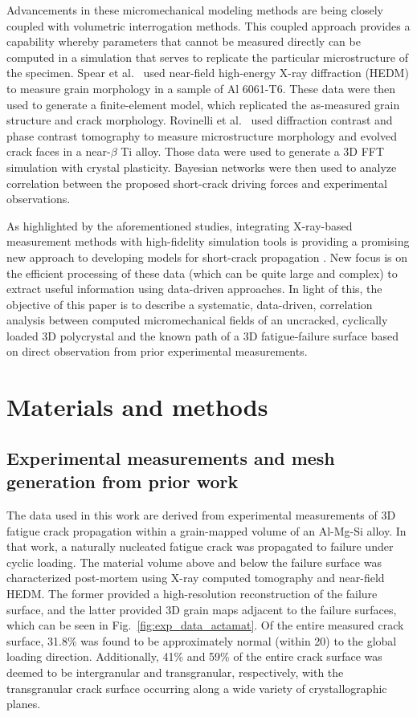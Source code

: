 Advancements in these micromechanical modeling methods are being closely coupled with volumetric interrogation methods.  This coupled approach provides a capability whereby parameters that cannot be measured directly can be computed in a simulation that serves to replicate the particular microstructure of the specimen. Spear et al.~\cite{spear2016} used near-field high-energy X-ray diffraction (HEDM) to measure grain morphology in a sample of Al 6061-T6. These data were then used to generate a finite-element model, which replicated the as-measured grain structure and crack morphology. Rovinelli et al.~\cite{Rovinelli_2017} used diffraction contrast and phase contrast tomography to measure microstructure morphology and evolved crack faces in a near-$\beta$ Ti alloy.  Those data were used to generate a 3D FFT simulation with crystal plasticity.  Bayesian networks were then used to analyze correlation between the proposed short-crack driving forces and experimental observations. 

As highlighted by the aforementioned studies, integrating X-ray-based measurement methods with high-fidelity simulation tools is providing a promising new approach to developing models for short-crack propagation \cite{Turner_2017}. New focus is on the efficient processing of these data (which can be quite large and complex) to extract useful information using data-driven approaches. In light of this, the objective of this paper is to describe a systematic, data-driven, correlation analysis between computed micromechanical fields of an uncracked, cyclically loaded 3D polycrystal and the known path of a 3D fatigue-failure surface based on direct observation from prior experimental measurements.

\section{Materials and methods}\label{methods}
\subsection{Experimental measurements and mesh generation from prior work} \label{prior_work}
The data used in this work are derived from experimental measurements \cite{spear2014} of 3D fatigue crack propagation within a grain-mapped volume of an Al-Mg-Si alloy. In that work, a naturally nucleated fatigue crack was propagated to failure under cyclic loading. The material volume above and below the failure surface was characterized post-mortem using X-ray computed tomography and near-field HEDM. The former provided a high-resolution reconstruction of the failure surface, and the latter provided 3D grain maps adjacent to the failure surfaces, which can be seen in Fig.~\ref{fig:exp_data_actamat}. Of the entire measured crack surface, 31.8\% was found to be approximately normal (within 20\degrees) to the global loading direction. Additionally, 41\% and 59\% of the entire crack surface was deemed to be intergranular and transgranular, respectively, with the transgranular crack surface occurring along a wide variety of crystallographic planes.

